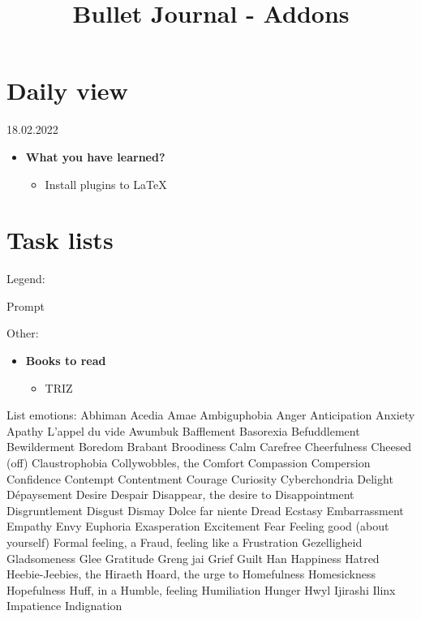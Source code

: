 \documentclass[a4paper]{article}
\title{Bullet Journal - Addons}
\begin{document}
\maketitle
\tableofcontents
\newpage
\section{Daily view}
18.02.2022
\begin{itemize}
	\item \textbf{What you have learned?}
    \begin{itemize}
        \item Install plugins to LaTeX
    \end{itemize}
\end{itemize}
\newpage
\section{Task lists}
Legend:
\begin{itemize}
	 [+] Prompt 
\end{itemize}
Other:
\begin{itemize}
	\item \textbf{Books to read}
    \begin{itemize}
        \item TRIZ
    \end{itemize}
\end{itemize}
\newpage
List emotions:
	 Abhiman
	 Acedia
	 Amae
	 Ambiguphobia
	 Anger
	 Anticipation
	 Anxiety
	 Apathy
	 L’appel du vide
	 Awumbuk
	 Bafflement
	 Basorexia
	 Befuddlement
	 Bewilderment
	 Boredom
	 Brabant
	 Broodiness
	 Calm
	 Carefree
	 Cheerfulness
	 Cheesed (off)
	 Claustrophobia
	 Collywobbles, the
	 Comfort
	 Compassion
	 Compersion
	 Confidence
	 Contempt
	 Contentment
	 Courage
	 Curiosity
	 Cyberchondria
	 Delight
	 Dépaysement
	 Desire
	 Despair
	 Disappear, the desire to
	 Disappointment
	 Disgruntlement
	 Disgust
	 Dismay
	 Dolce far niente
	 Dread
	 Ecstasy
	 Embarrassment
	 Empathy
	 Envy
	 Euphoria
	 Exasperation
	 Excitement
	 Fear
	 Feeling good (about yourself)
	 Formal feeling, a
	 Fraud, feeling like a
	 Frustration
	 Gezelligheid
	 Gladsomeness
	 Glee
	 Gratitude
	 Greng jai
	 Grief
	 Guilt
	 Han
	 Happiness
	 Hatred
	 Heebie-Jeebies, the
	 Hiraeth
	 Hoard, the urge to
	 Homefulness
	 Homesickness
	 Hopefulness
	 Huff, in a
	 Humble, feeling
	 Humiliation
	 Hunger
	 Hwyl
	 Ijirashi
	 Ilinx
	 Impatience
	 Indignation
\end{document}
